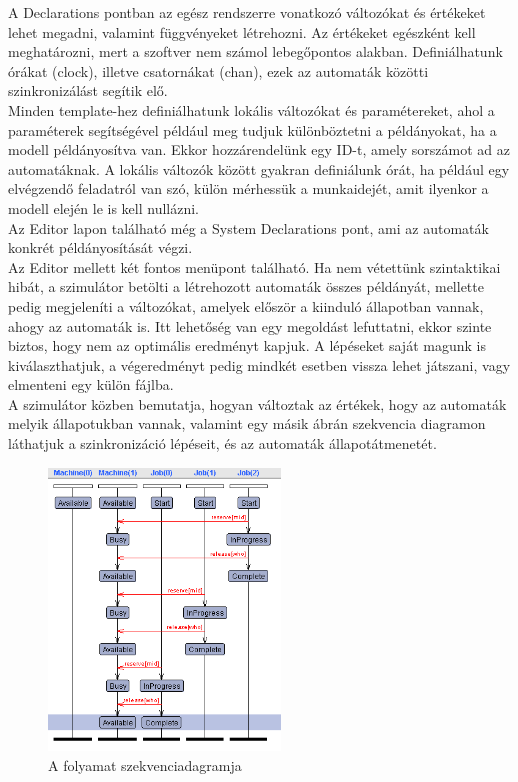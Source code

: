 \documentclass {report}
\begin{document}
A  Declarations pontban az egész rendszerre vonatkozó változókat és értékeket lehet megadni, valamint függvényeket létrehozni. Az értékeket egészként kell meghatározni, mert a szoftver nem számol lebegőpontos alakban. Definiálhatunk órákat (clock), illetve csatornákat (chan), ezek az automaták közötti szinkronizálást segítik elő.\\
Minden template-hez definiálhatunk lokális változókat és paramétereket, ahol a paraméterek segítségével például meg tudjuk különböztetni a példányokat, ha a modell példányosítva van. Ekkor hozzárendelünk egy ID-t, amely sorszámot ad az automatáknak. A lokális változók között gyakran definiálunk órát, ha például egy elvégzendő feladatról van szó, külön mérhessük a munkaidejét, amit ilyenkor a modell elején le is kell nullázni.\\ 
Az Editor lapon található még a System Declarations pont, ami az automaták konkrét példányosítását végzi.\\
Az Editor mellett két fontos menüpont található. Ha nem vétettünk szintaktikai hibát, a szimulátor betölti a létrehozott automaták összes példányát, mellette pedig megjeleníti a változókat, amelyek először a kiinduló állapotban vannak, ahogy az automaták is. Itt lehetőség van egy megoldást lefuttatni, ekkor szinte biztos, hogy nem az optimális eredményt kapjuk. A lépéseket saját magunk is kiválaszthatjuk, a végeredményt pedig mindkét esetben vissza lehet játszani, vagy elmenteni egy külön fájlba.  \\
A szimulátor közben bemutatja, hogyan változtak az értékek, hogy az automaták melyik állapotukban vannak, valamint egy másik ábrán szekvencia diagramon láthatjuk a szinkronizáció lépéseit, és az automaták állapotátmenetét.\\
\begin{figure}[htpb]
\begin{center}
\includegraphics[height=7.5cm]{szekvencia}
\caption{A folyamat szekvenciadagramja}
\end{center}
\end{figure}
\end{document}
